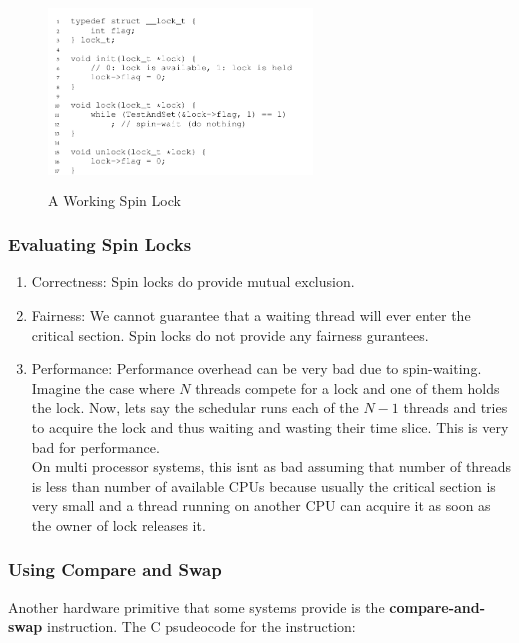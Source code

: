 \begin{figure}[h!]
    \begin{center}
        \includegraphics[width=7cm, height=5cm]{img/283.png}
        \caption{A Working Spin Lock}
    \end{center}
\end{figure}

\subsubsection{Evaluating Spin Locks}

\begin{enumerate}
    \item Correctness: Spin locks do provide mutual exclusion.
    \item Fairness: We cannot guarantee that a waiting thread will ever enter
        the critical section. Spin locks do not provide any fairness gurantees.
    \item Performance: Performance overhead can be very bad due to spin-waiting.
        Imagine the case where $N$ threads compete for a lock and one of them holds
        the lock. Now, lets say the schedular runs each of the $N - 1$ threads
        and tries to acquire the lock and thus waiting and wasting their time
        slice. This is very bad for performance.\\

        On multi processor systems, this isnt as bad assuming that number of
        threads is less than number of available CPUs because usually the critical
        section is very small and a thread running on another CPU can acquire
        it as soon as the owner of lock releases it.
\end{enumerate}

\subsubsection{Using Compare and Swap}

Another hardware primitive that some systems provide is the \textbf{compare-and-
swap} instruction. The C psudeocode for the instruction:

